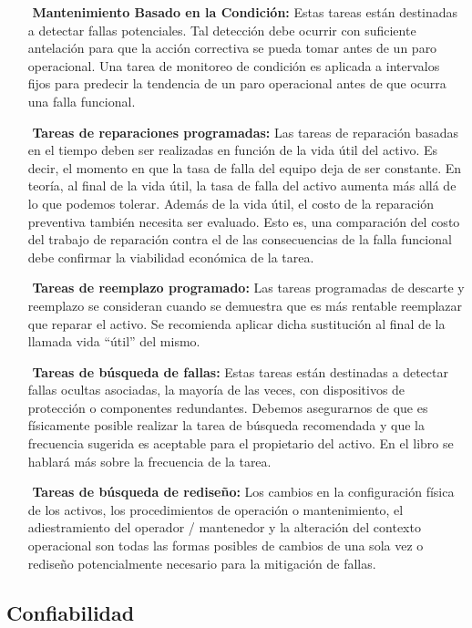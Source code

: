 \begin{itemize}
\item[$ $] \textbf{Mantenimiento Basado en la Condición:} Estas tareas están destinadas a detectar fallas potenciales. Tal detección debe ocurrir con suficiente antelación para que la acción correctiva se pueda tomar antes de un paro operacional. Una tarea de monitoreo de condición es aplicada a intervalos fijos para predecir la tendencia de un paro operacional antes de que ocurra una falla funcional.
\item[$ $] \textbf{Tareas de reparaciones programadas:} Las tareas de reparación basadas en el tiempo deben ser realizadas en función de la vida útil del activo. Es decir, el momento en que la tasa de falla del equipo deja de ser constante. En teoría, al final de la vida útil, la tasa de falla del activo aumenta más allá de lo que podemos tolerar. Además de la vida útil, el costo de la reparación preventiva también necesita ser evaluado. Esto es, una comparación del costo del trabajo de reparación contra el de las consecuencias de la falla funcional debe confirmar la viabilidad económica de la tarea.
\item[$ $] \textbf{Tareas de reemplazo programado:} Las tareas programadas de descarte y reemplazo se consideran cuando se demuestra que es más rentable reemplazar que reparar el activo. Se recomienda aplicar dicha sustitución al final de la llamada vida “útil” del mismo.
\item[$ $] \textbf{Tareas de búsqueda de fallas:} Estas tareas están destinadas a detectar fallas ocultas asociadas, la mayoría de las veces, con dispositivos de protección o componentes redundantes. Debemos asegurarnos de que es físicamente posible realizar la tarea de búsqueda recomendada y que la frecuencia sugerida es aceptable para el propietario del activo. En el libro se hablará más sobre la frecuencia de la tarea.
\item[$ $] \textbf{Tareas de búsqueda de rediseño:} Los cambios en la configuración física de los activos, los procedimientos de operación o mantenimiento, el adiestramiento del operador / mantenedor y la alteración del contexto operacional son todas las formas posibles de cambios de una sola vez o rediseño potencialmente necesario para la mitigación de fallas.

\end{itemize}


\subsection{Confiabilidad}

